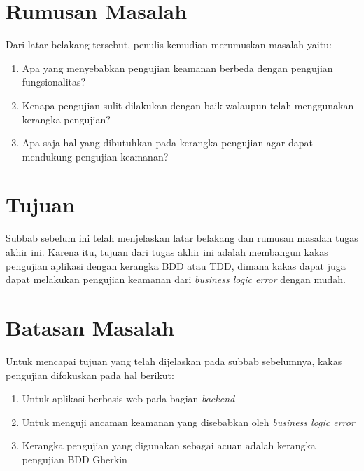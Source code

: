 \section{Rumusan Masalah}

Dari latar belakang tersebut, penulis kemudian merumuskan masalah yaitu:

\begin{enumerate}
    \item Apa yang menyebabkan pengujian keamanan berbeda dengan pengujian fungsionalitas?
    \item Kenapa pengujian sulit dilakukan dengan baik walaupun telah menggunakan kerangka pengujian?
    \item Apa saja hal yang dibutuhkan pada kerangka pengujian agar dapat mendukung pengujian keamanan?
\end{enumerate}

\section{Tujuan}

Subbab sebelum ini telah menjelaskan latar belakang dan rumusan masalah tugas akhir ini.
Karena itu, tujuan dari tugas akhir ini adalah membangun kakas pengujian aplikasi
dengan kerangka BDD atau TDD, dimana kakas dapat juga dapat melakukan pengujian
keamanan dari \emph{business logic error} dengan mudah.

\section{Batasan Masalah}

Untuk mencapai tujuan yang telah dijelaskan pada subbab sebelumnya, kakas pengujian difokuskan pada hal berikut:

\begin{enumerate}
    \item Untuk aplikasi berbasis web pada bagian \emph{backend}
    \item Untuk menguji ancaman keamanan yang disebabkan oleh \emph{business logic error}
    \item Kerangka pengujian yang digunakan sebagai acuan adalah kerangka pengujian BDD Gherkin
\end{enumerate}

